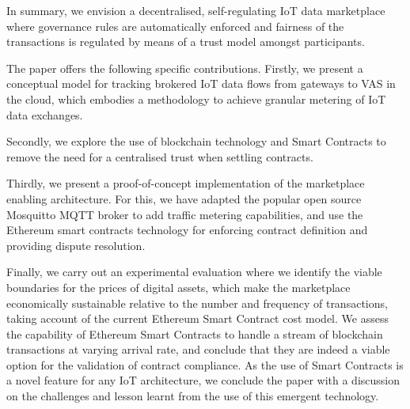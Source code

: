\documentclass[chi_draft]{sigchi}
\begin{document}
In summary, we envision a decentralised, self-regulating IoT data marketplace where governance rules are automatically enforced and fairness of the transactions is regulated by means of a trust model amongst participants.

The paper offers the following specific contributions.
%
Firstly,  we present a conceptual model for tracking brokered IoT data flows from gateways to VAS in the cloud, which embodies a methodology to achieve granular metering of IoT data exchanges.

Secondly, we explore the use of blockchain technology and Smart Contracts to remove the need for a centralised trust when settling contracts. 

Thirdly, we present a proof-of-concept implementation of the marketplace enabling architecture. For this, we have adapted the popular open source Mosquitto MQTT broker to add traffic metering capabilities, and use the Ethereum smart contracts technology for enforcing contract definition and providing dispute resolution.

Finally, we carry out an experimental evaluation where we identify the viable boundaries for the prices of digital assets, which make the marketplace economically sustainable relative to the number and frequency of transactions, taking account of the current Ethereum Smart Contract cost model.
We assess the capability of Ethereum Smart Contracts to handle a stream of blockchain transactions at varying arrival rate, and conclude that they are indeed a viable option for the validation of contract compliance.
As the use of Smart Contracts is a novel feature for any IoT architecture, we conclude the paper with a discussion on the challenges and lesson learnt from the use of this emergent technology.

%
%
\end{document}
